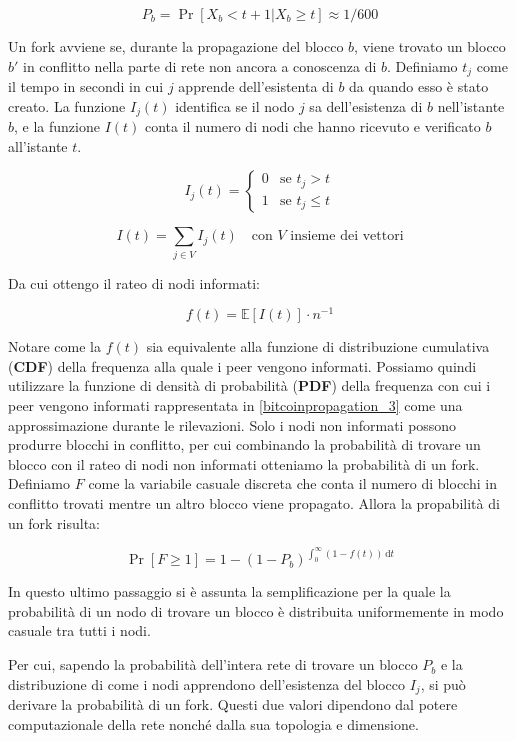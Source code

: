 \[ P_b = \Pr\left[ X_b < t + 1 | X_b \geq t\right] \approx 1/600 \]

Un fork avviene se, durante la propagazione del blocco $b$, viene
trovato un blocco $b'$ in conflitto nella parte di rete non ancora a
conoscenza di $b$. Definiamo $t_j$ come il tempo in secondi in cui $j$
apprende dell'esistenta di $b$ da quando esso è stato creato. La
funzione $I_{j}(t)$ identifica se il nodo $j$ sa dell'esistenza di $b$
nell'istante $b$, e la funzione $I(t)$ conta il numero di nodi che hanno
ricevuto e verificato $b$ all'istante $t$.

\[ I_{j}(t) = \begin{cases}
    0 &\textrm{se } t_j > t \\
    1 &\textrm{se } t_j \leq t
\end{cases}\]

\[ I(t) = \sum_{j \in V} I_{j}(t) \quad  \textrm{con }V\textrm{ insieme dei vettori} \]

Da cui ottengo il rateo di nodi informati:

\[ f(t) = \mathbb{E}[I(t)] \cdot n^{-1} \]

Notare come la $f(t)$ sia equivalente alla funzione di distribuzione
cumulativa (\textbf{CDF}) della frequenza alla quale i peer vengono
informati. Possiamo quindi utilizzare la funzione di densità di
probabilità (\textbf{PDF}) della frequenza con cui i peer vengono
informati rappresentata in \ref{bitcoinpropagation_3} come una
approssimazione durante le rilevazioni. Solo i nodi non informati
possono produrre blocchi in conflitto, per cui combinando la probabilità
di trovare un blocco con il rateo di nodi non informati otteniamo la
probabilità di un fork. Definiamo $F$ come la variabile casuale discreta
che conta il numero di blocchi in conflitto trovati mentre un altro
blocco viene propagato. Allora la propabilità di un fork risulta:

\[ \Pr\left[F \geq 1\right] = 1 - (1 - P_b)^{\int_{0}^{\infty} \! (1 - f(t)) \, \mathrm{d}t} \]

In questo ultimo passaggio si è assunta la semplificazione per la quale
la probabilità di un nodo di trovare un blocco è distribuita
uniformemente in modo casuale tra tutti i nodi.

Per cui, sapendo la probabilità dell'intera rete di trovare un blocco
$P_b$ e la distribuzione di come i nodi apprendono dell'esistenza del
blocco $I_j$, si può derivare la probabilità di un fork. Questi due
valori dipendono dal potere computazionale della rete nonché dalla sua
topologia e dimensione.

